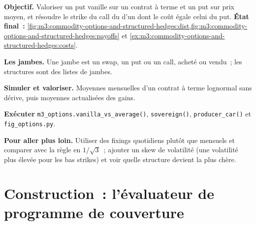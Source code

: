 \begin{tutorial}
\textbf{Objectif.} Valoriser un put vanille sur un contrat à terme et un put sur prix moyen, et résoudre le strike du call du
d'un  dont le coût égale celui du put. \textbf{État final~:}
\cref{fig:m3:commodity-options-and-structured-hedges:dist,fig:m3:commodity-options-and-structured-hedges:payoffs}
et \cref{ex:m3:commodity-options-and-structured-hedges:costs}.
\begin{tutsteps}
\item \textbf{Les jambes.} Une jambe est un swap, un put ou un call, acheté ou vendu~; les structures sont des listes de jambes.
\label{lst:m3:commodity-options-and-structured-hedges:legs}
\item \textbf{Simuler et valoriser.} Moyennes mensuelles d'un contrat à terme lognormal sans dérive, puis moyennes actualisées
des gains.
\label{lst:m3:commodity-options-and-structured-hedges:value}
\item \textbf{Exécuter} \texttt{m3\_options.vanilla\_vs\_average()}, \texttt{sovereign()},
\texttt{producer\_car()} et \texttt{fig\_options.py}.
\end{tutsteps}
\textbf{Pour aller plus loin.} Utiliser des fixings quotidiens plutôt que mensuels et comparer avec la règle en $1/\sqrt3$~;
ajouter un skew de volatilité (une volatilité plus élevée pour les bas strikes) et voir quelle structure devient la plus chère.
\end{tutorial}

\section{Construction~: l'évaluateur de programme de couverture}\label{bld:m3:commodity-options-and-structured-hedges:hedgeprog}

